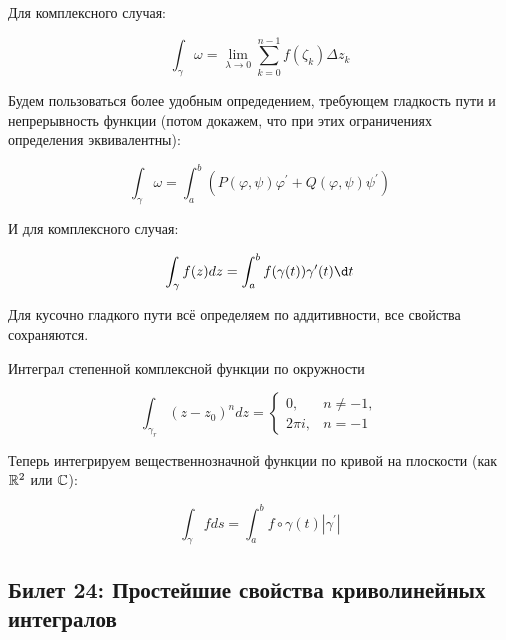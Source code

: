 \documentclass[12pt, a4paper, oneside]{memoir}
\begin{document}
Для комплексного случая: 

\begin{equation}
    \int_\gamma \omega=\lim _{\lambda \rightarrow 0} \sum_{k=0}^{n-1} f\left(\zeta_k\right) \Delta z_k
\end{equation}


Будем пользоваться более удобным опредедением, требующем гладкость пути и непрерывность функции 
(потом докажем, что при этих ограничениях определения эквивалентны):

\begin{equation}
    \int_\gamma \omega=\int_a^b\left(P(\varphi, \psi) \varphi^{\prime}+Q(\varphi, \psi) \psi^{\prime}\right)
\end{equation}

И для комплексного случая:

\begin{equation}
    \int_\gamma f(z) d z=\int_a^b f(\gamma(t)) \gamma^{\prime}(t) \d t
\end{equation}

\begin{remark}
    Для кусочно гладкого пути всё определяем по аддитивности, все свойства сохраняются.
\end{remark}


\begin{example}
    Интеграл степенной комплексной функции по окружности
    
    \begin{equation}
        \int_{\gamma_r}\left(z-z_0\right)^n d z = \begin{cases} 0, & n \neq-1, \\ 2 \pi i, & n=-1 \end{cases}
    \end{equation}
\end{example}


\begin{definition} 
    
    Теперь интегрируем вещественнозначной функции по кривой на плоскости (как ${\mathbb{R}}^2$ или ${\mathbb{C}}$):

    \begin{equation}
        \int_\gamma f d s = \int_a^b f \circ \gamma(t) |\gamma^{\prime}|
    \end{equation}
\end{definition}



\subsection{Билет 24: Простейшие свойства криволинейных интегралов}
\end{document}
